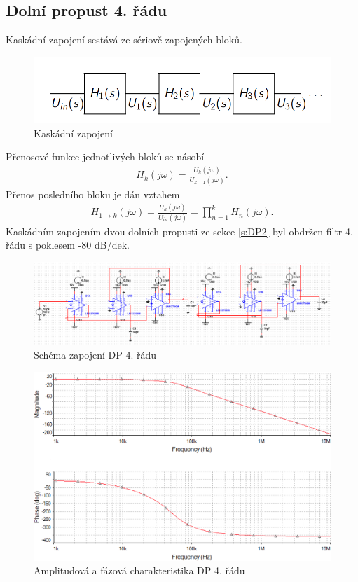 \subsection{Dolní propust 4. řádu}\label{s:DP4}
Kaskádní zapojení sestává ze sériově zapojených bloků.
\begin{figure}[H]
\centering
\includegraphics[scale=0.4]{schemata.png}
\caption{Kaskádní zapojení \cite{5}}
\end{figure}
\noindent Přenosové funkce jednotlivých bloků se násobí
\begin{align}
H_k(j\omega) = \frac{U_k (j\omega)}{U_{k-1}(j\omega)}.
\end{align}
Přenos posledního bloku je dán vztahem
\begin{align}
H_{1 \rightarrow k}(j\omega) = \frac{U_k (j\omega)}{U_{in}(j\omega)} = \prod _{n=1}^{k} H_n(j\omega).
\end{align}
Kaskádním zapojením dvou dolních propusti ze sekce \ref{s:DP2} byl obdržen filtr 4. řádu s poklesem -80 dB/dek.
\begin{figure}[H]
\centering
\includegraphics[scale=0.5]{lpbp32.png}
\caption{Schéma zapojení DP 4. řádu}
\end{figure}\begin{figure}[H]
\centering
\includegraphics[scale=0.45]{bplp3.png}
\caption{Amplitudová a fázová charakteristika DP 4. řádu}
\end{figure}
